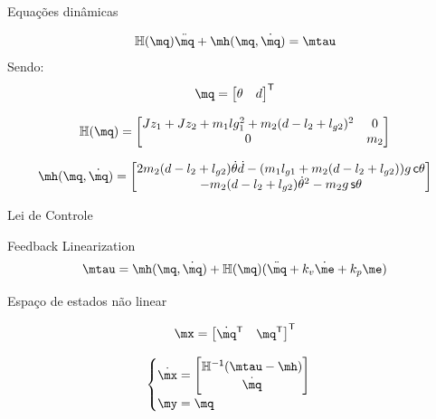\documentclass[25pt,landscape]{beamer}
\begin{document}
\begin{frame}{Equa\c{c}\~oes din\^amicas}
    \begin{block}{}
        \begin{equation}
			\mH(\mq) \ddot{\mq} + \mh(\mq, \dot{\mq}) = \mtau
		\end{equation}
		Sendo:
		\begin{equation}
			\mq = \begin{bmatrix} \theta & d \end{bmatrix}^\msT
		\end{equation}

		\begin{equation}
			\mH(\mq) = 
			\begin{bmatrix}
				Jz_1 + Jz_2 + m_1 lg_1^2 + m_2 (d - l_2 + l_{g2})^2 & 0 \\
				0 & m_2
			\end{bmatrix}
		\end{equation}

		\begin{equation}
			\mh(\mq, \dot{\mq}) = 
			\begin{bmatrix}
				2 m_2 (d-l_2+l_{g2}) \dot{\theta} \dot{d} - (m_1 l_{g1} + m_2 (d-l_2 + l_{g2}) ) g \,\ccos \theta \\
				-m_2  (d-l_2+l_{g2})\dot{\theta}^2  - m_2 g \, \ssin \theta
			\end{bmatrix}
		\end{equation}		
    \end{block}
\end{frame}

\begin{frame}{Lei de Controle}
    \begin{block}{Feedback Linearization}
		\begin{equation}
			\mtau = \mh(\mq,\dot{\mq}) + \mH(\mq) ( \ddot{\mq} + k_v \dot{\me} + k_p \me ) 
		\end{equation}
    \end{block}
\end{frame}

\begin{frame}{Espaço de estados n\~ao linear}
    \begin{block}{}
        \begin{equation}
        	\mx = \begin{bmatrix} \dot{\mq}^\msT & \mq^\msT \end{bmatrix}^\msT
        \end{equation}

        \begin{equation}
        	\begin{cases}
        		\dot{\mx} =
        		\begin{bmatrix} 
        			\mH^\msI(\mtau - \mh) \\
        			\dot{\mq}
        		\end{bmatrix} \\
        		\my = \mq
        	\end{cases}
        \end{equation}
    \end{block}
\end{frame}
\end{document}
